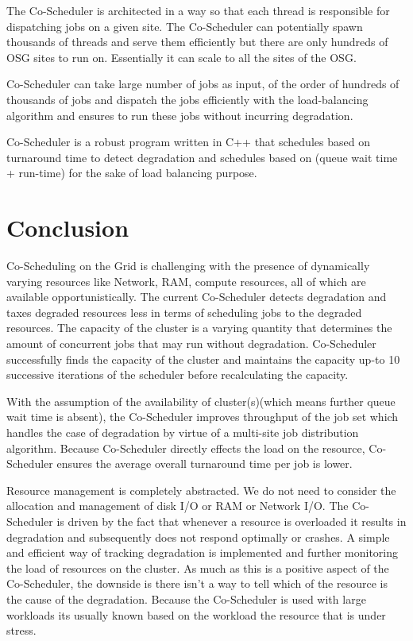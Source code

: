 \documentclass[ms,electronic,double]{nuthesis}
\begin{document}
The Co-Scheduler is architected in a way so that each thread is responsible for 
dispatching jobs on a given site. The Co-Scheduler can potentially spawn thousands 
of threads and serve them efficiently but there are only hundreds of OSG sites 
to run on. Essentially it can scale to all the sites of the OSG. 

Co-Scheduler can take large number of jobs as input, of the order of hundreds 
of thousands of jobs and dispatch the jobs efficiently with the load-balancing 
algorithm and ensures to run these jobs without incurring degradation.

Co-Scheduler is a robust program written in C++ that schedules based on 
turnaround time to detect degradation and schedules based on  (queue wait time + 
run-time) for the sake of load balancing purpose.

\chapter{Conclusion}

Co-Scheduling on the Grid is challenging with the presence of dynamically varying 
resources like Network, RAM, compute resources, all of which are available opportunistically. 
The current Co-Scheduler 
detects degradation and taxes degraded resources less in terms of scheduling 
jobs to the degraded resources. The capacity of the cluster is a varying 
quantity that determines the amount of concurrent jobs that may run without 
degradation. Co-Scheduler successfully finds the capacity of the cluster and 
maintains the capacity up-to 10 successive iterations of the scheduler before 
recalculating the capacity.

With the assumption of the availability of cluster(s)(which means further queue wait time is 
absent), the Co-Scheduler improves throughput of the job set which handles the 
case of degradation by virtue of a multi-site job distribution algorithm. Because Co-Scheduler directly effects the load on the resource, Co-Scheduler 
ensures the average overall turnaround time per job is lower.

Resource management is completely abstracted. We do not need to consider the 
allocation and management of disk I/O or RAM or Network I/O. The Co-Scheduler is 
driven by the fact that whenever a resource is overloaded it results in 
degradation and subsequently does not respond optimally or crashes. A simple and 
efficient way of tracking degradation is implemented and further monitoring the load of 
resources on the cluster. As much as this is a positive aspect of the 
Co-Scheduler, the downside is there isn't a way to tell which of the resource is 
the cause of the degradation. Because the Co-Scheduler is used with large workloads its usually known based on 
the workload the resource that is under stress.
\end{document}
